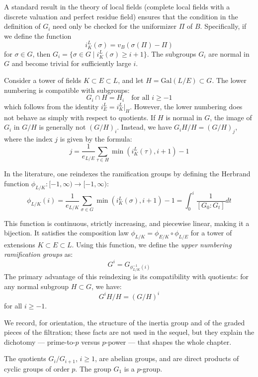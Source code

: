 A standard result in the theory of local fields (complete local fields with a discrete valuation and perfect residue field)
ensures that the condition in the definition of $G_i$ need only be checked for the uniformizer $\Pi$ of $B$.
Specifically, if we define the function
\[
i^L_K(\sigma) = v_B(\sigma(\Pi) - \Pi)
\]
for $\sigma \in G$, then $G_i = \{ \sigma \in G \mid i^L_K(\sigma) \geq i + 1 \}$.
The subgroups $G_i$ are normal in $G$ and become trivial for sufficiently large $i$.

Consider a tower of fields $K \subset E \subset L$, and let $H = \text{Gal}(L/E) \subset G$. The lower numbering is compatible with subgroups:
\[
G_i \cap H = H_i \quad \text{for all } i \geq -1
\]
which follows from the identity $i^L_E = i^L_K|_{H}$.
However, the lower numbering does not behave as simply with respect to quotients. If $H$ is normal in $G$, the image of $G_i$ in $G/H$ is generally not $(G/H)_i$.
Instead, we have $G_i H / H = (G/H)_j$, where the index $j$ is given by the formula:
\[
j = \frac{1}{e_{L/E}} \sum_{\tau \in H} \min(i^L_K(\tau), i+1) - 1
\]


In the literature, one reindexes the ramification groups by defining the Herbrand function $\phi_{L/K} : [-1, \infty ) \to [-1, \infty )$:
\[ \phi_{L/K}(i) = \frac{1}{e_{L/K}}\sum_{\sigma \in G} \min(i^L_K(\sigma), i+1)-1 = \int _0^i \frac{1}{[G_0 : G_t]} dt \]

This function is continuous, strictly increasing, and piecewise linear, making it a bijection.
It satisfies the composition law $\phi_{L/K} = \phi_{E/K} \circ \phi_{L/E}$ for a tower of extensions $K \subset E \subset L$.
Using this function, we define the \textit{upper numbering ramification groups} as:
\[
G^i = G_{\phi_{L/K}^{-1}(i)}
\]
The primary advantage of this reindexing is its compatibility with quotients: for any normal subgroup $H \subset G$, we have:
\[
G^i H / H = (G/H)^i
\]
for all $i \geq -1$.

We record, for orientation, the structure of the inertia group and of the
graded pieces of the filtration; these facts are not used in the sequel, but
they explain the dichotomy --- prime-to-$p$ versus $p$-power --- that shapes
the whole chapter.

\begin{prop}
    The quotients $G_i/G_{i+1}$, $i \geq 1$, are abelian groups, and are direct products of cyclic groups of order $p$.
    The group $G_1$ is a $p$-group.
\end{prop}

